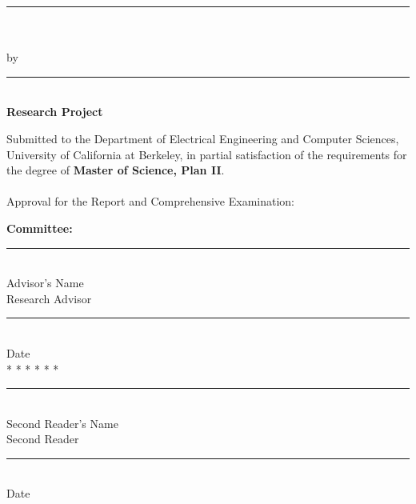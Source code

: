 

\pagestyle{empty}
\topmargin -0.60in
\oddsidemargin 0.0625in
\textheight 9.00in
\textwidth 6.50in
\renewcommand{\baselinestretch}{1.4}
\parskip 0.20in

\usepackage{times}


\large
\begin{center}
\rule[.1in]{6.5in}{.01in}\\
{\bf \ttitle}\\
by \tauthor\\
\rule[.1in]{6.5in}{.01in}\\
{\bf Research Project}\\
\noindent
\end{center}
\normalsize
Submitted to the Department of Electrical Engineering and Computer
Sciences, University of California at Berkeley, in partial satisfaction
of the requirements for the degree of {\bf Master of Science, Plan II}.
\\
\\
\noindent
Approval for the Report and Comprehensive Examination:
\begin{center}
{\bf Committee:}\\
\vspace{9.5 mm}
\rule{3.5in}{.01in}\\
Advisor's Name\\
Research Advisor\\
\vspace{9.5 mm}
\rule{3.5in}{.01in}\\
Date\\
\vspace{7 mm}
* * * * * *\\
\vspace{9.5 mm}
\rule{3.5in}{.01in}\\
Second Reader's Name\\
Second Reader\\
\vspace{9.5 mm}
\rule{3.5in}{.01in}\\
Date\\
\end{center}

